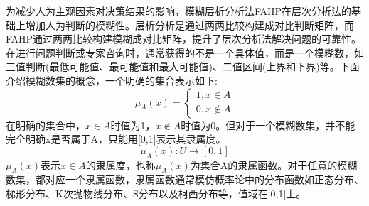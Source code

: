 为减少人为主观因素对决策结果的影响，模糊层析分析法FAHP在层次分析法的基础上增加人为判断的模糊性。层析分析是通过两两比较构建成对比判断矩阵，而FAHP通过两两比较构建模糊成对比矩阵，提升了层次分析法解决问题的可靠性。在进行问题判断或专家咨询时，通常获得的不是一个具体值，而是一个模糊数，如三值判断(最低可能值、最可能值和最大可能值)、二值区间(上界和下界)等。下面介绍模糊数集的概念，一个明确的集合表示如下:
\begin{equation}
\mu_{A}(x) = \left\{\begin{array}{l}
1, x\in A \\ [0.3cm]
0, x\notin A
\end{array}\right.
\end{equation}
在明确的集合中，$x\in A$时值为1，$x\notin A$时值为0。但对于一个模糊数集，并不能完全明确x是否属于A，只能用[0,1]表示其隶属度。
\begin{equation}
\mu_{A}(x):U\to[0,1]
\end{equation}
\begin{math}\mu_{A}(x)\end{math}表示\begin{math}x\in A\end{math}的隶属度，也称\begin{math}\mu_{A}(x)\end{math}为集合A的隶属函数。对于任意的模糊数集，都对应一个隶属函数，隶属函数通常模仿概率论中的分布函数如正态分布、梯形分布、K次抛物线分布、S分布以及柯西分布等，值域在[0,1]上。

